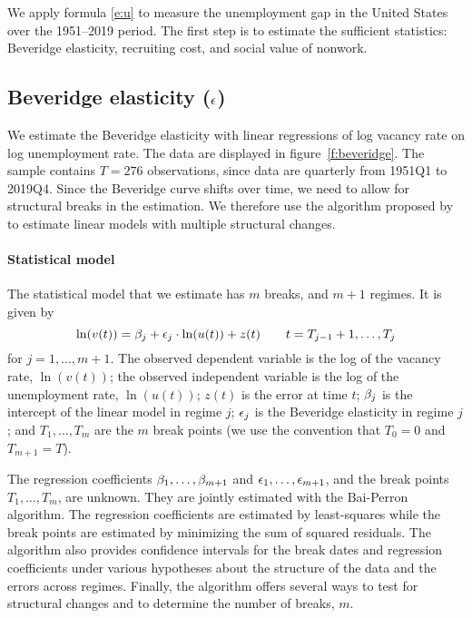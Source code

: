 \documentclass[letterpaper,12pt,leqno]{article}
\begin{document}
We apply formula \eqref{e:u} to measure the unemployment gap in the United States over the 1951--2019 period. The first step is to estimate the sufficient statistics: Beveridge elasticity, recruiting cost, and social value of nonwork.

\subsection{Beveridge elasticity ($\epsilon$)} 

We estimate the Beveridge elasticity with linear regressions of log vacancy rate on log unemployment rate. The data are displayed in figure~\ref{f:beveridge}. The sample contains $T = 276$ observations, since data are quarterly from 1951Q1 to 2019Q4. Since the Beveridge curve shifts over time, we need to allow for structural breaks in the estimation. We therefore use the algorithm proposed by  to estimate linear models with multiple structural changes.

\paragraph{Statistical model}  The statistical model that we estimate has $m$ breaks, and $m+1$ regimes. It is given by 
\begin{equation}
 \ln(v(t)) = \b_j + \e_j \cdot \ln(u(t)) + z(t)  \qquad t = T_{j-1}+1, \ldots,T_j
\label{e:bp}\end{equation} 
for $j = 1, \ldots, m+1$. The observed dependent variable is the log of the vacancy rate, $\ln(v(t))$; the observed independent variable is the log of the unemployment rate, $\ln(u(t))$; $z(t)$ is the error at time $t$; $\beta_j$ is the intercept of the linear model in regime $j$; $\epsilon_j$ is the Beveridge elasticity in regime $j$; and $T_1,\ldots,T_m$ are the $m$ break points (we use the convention that $T_0=0$ and $T_{m+1}=T$).   

The regression coefficients $\beta_1,\ldots,\beta_{m+1}$ and $\epsilon_1,\ldots,\epsilon_{m+1}$, and the break points $T_1,\ldots,T_m$, are unknown. They are jointly estimated with the Bai-Perron algorithm. The regression coefficients are estimated by least-squares while the break points are estimated by minimizing the sum of squared residuals. The algorithm also provides confidence intervals for the break dates and regression coefficients under various hypotheses about the structure of the data and the errors across regimes. Finally, the algorithm offers several ways to test for structural changes and to determine the number of breaks, $m$. 
\end{document}
